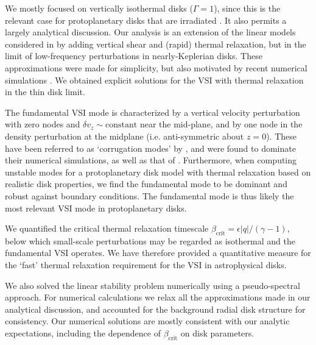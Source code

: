 
We mostly focused on vertically isothermal disks ($\Gamma=1$), since
this is the relevant case for protoplanetary disks that are irradiated
\citep{chiang97}. It also permits a largely analytical discussion.
Our analysis is an extension of the linear models considered in
\cite{lubow93} by  adding vertical shear and (rapid) thermal
relaxation, but in the limit of low-frequency perturbations in
nearly-Keplerian disks. These approximations were made for simplicity,
but also motivated by recent numerical simulations
\citep{nelson13}. We obtained explicit solutions for the VSI with
thermal relaxation in the thin disk limit. 


The fundamental VSI mode is characterized by a vertical velocity
perturbation with zero nodes and $\delta v_z\sim\mathrm{constant}$
near the mid-plane, and by one node in the density perturbation at the
midplane  (i.e. anti-symmetric about $z=0$).  These have been referred
to as `corrugation modes' by \cite{nelson13}, and were found to
dominate their numerical simulations, as well as that of
\cite{stoll14}. Furthermore, when computing unstable modes for a
protoplanetary disk model with thermal relaxation based on realistic
disk properties, we find the fundamental mode to be dominant and
robust against boundary conditions. The fundamental mode is thus
likely the most relevant VSI mode in protoplanetary disks.  

We quantified the critical thermal relaxation timescale 
$\beta_\mathrm{crit}=\epsilon|q|/(\gamma-1)$, below which small-scale
perturbations may be regarded as isothermal and the fundamental VSI
operates. %
We have therefore provided a quantitative measure for the `fast'
thermal relaxation requirement for the VSI in astrophysical disks. 

We also solved the linear stability problem numerically using a
pseudo-spectral approach. For numerical calculations we relax all the
approximations made in our analytical discussion, and accounted for
the background radial disk structure for consistency.  Our
numerical solutions are mostly consistent with our analytic 
expectations, including the dependence of $\beta_\mathrm{crit}$ on
disk parameters.  

